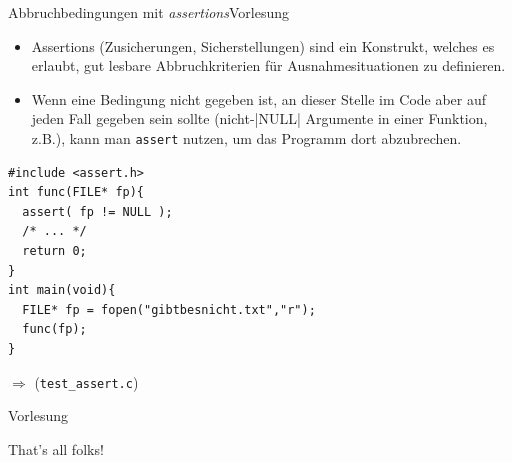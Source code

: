 \documentclass[xcolor=dvipsnames]{beamer}
\newcounter{lecturecounter}
\begin{document}
\begin{frame}[fragile]{Abbruchbedingungen mit \emph{assertions}}{Vorlesung }
\begin{block}{}
  \begin{itemize}
    \item{Assertions (Zusicherungen, Sicherstellungen) sind ein Konstrukt, welches es erlaubt, gut lesbare Abbruchkriterien für Ausnahmesituationen zu definieren.} 
    \item{Wenn eine Bedingung nicht gegeben ist, an dieser Stelle im Code aber auf jeden Fall gegeben sein sollte (nicht-\veb|NULL| Argumente in einer Funktion, z.B.), kann man \verb|assert| nutzen, um das Programm dort abzubrechen.}
  \end{itemize}
\end{block}
\begin{lstlisting}
#include <assert.h>
int func(FILE* fp){
  assert( fp != NULL );
  /* ... */
  return 0;
}
int main(void){
  FILE* fp = fopen("gibtbesnicht.txt","r");
  func(fp);
}  
\end{lstlisting}
$\Rightarrow$ (\verb|test_assert.c|)
\end{frame}

\begin{frame}[fragile]{}{Vorlesung }

\begin{minipage}{\textwidth}
  \centering
  \Huge That's all folks!
\end{minipage}
\end{frame}
\end{document}
